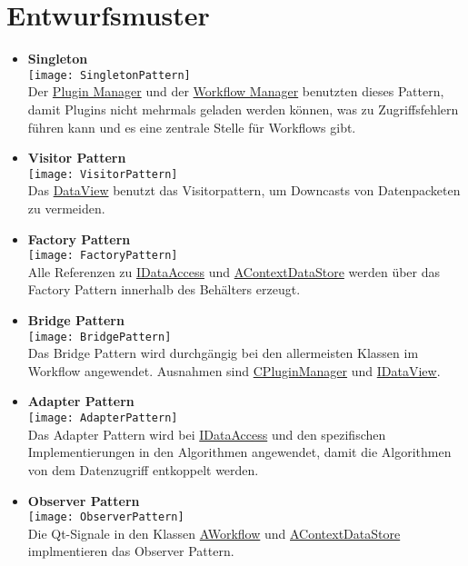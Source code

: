 \section{Entwurfsmuster}
\begin{itemize}
	\item \textbf{Singleton}
	\\\texttt{[image: SingletonPattern]}
	\\ Der \hyperref[Workflow:CPluginManager]{Plugin Manager} und der \hyperref[Workflow:CWorkflowManager]{Workflow Manager} benutzten dieses Pattern, damit Plugins nicht mehrmals geladen werden können, was zu Zugriffsfehlern führen kann und es eine zentrale Stelle für Workflows gibt.
	\item \textbf{Visitor Pattern}
	\\\texttt{[image: VisitorPattern]}
	\\ Das \hyperref[Workflow:IDataView]{DataView} benutzt das Visitorpattern, um Downcasts von Datenpacketen zu vermeiden.
	\item \textbf{Factory Pattern}
	\\\texttt{[image: FactoryPattern]}
	\\ Alle Referenzen zu \hyperref[Workflow:IDataAccess]{IDataAccess} und \hyperref[Workflow:AContextDataStore]{AContextDataStore} werden über das Factory Pattern innerhalb des Behälters erzeugt.
	\item \textbf{Bridge Pattern}
	\\\texttt{[image: BridgePattern]}
	\\ Das Bridge Pattern wird durchgängig bei den allermeisten Klassen im Workflow angewendet. Ausnahmen sind \hyperref[Workflow:CPluginManager]{CPluginManager} und \hyperref[Workflow:IDataView]{IDataView}.
	\item \textbf{Adapter Pattern}
	\\\texttt{[image: AdapterPattern]}
	\\ Das Adapter Pattern wird bei \hyperref[Workflow:IDataAccess]{IDataAccess} und den spezifischen Implementierungen in den Algorithmen angewendet, damit die Algorithmen von dem Datenzugriff entkoppelt werden.
	\item \textbf{Observer Pattern}
	\\\texttt{[image: ObserverPattern]}
	\\ Die Qt-Signale in den Klassen \hyperref[Workflow:AWorkflow]{AWorkflow} und \hyperref[Workflow:AContextDataStore]{AContextDataStore} implmentieren das Observer Pattern.
\end{itemize}

